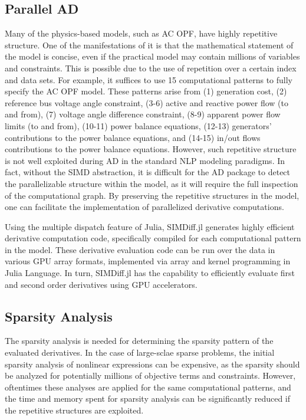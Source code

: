 \subsection{Parallel AD}
Many of the physics-based models, such as AC OPF, have highly repetitive
structure. One of the manifestations of it is that the mathematical
statement of the model is concise, even if the practical model may contain
millions of variables and constraints. This is possible due to the use of
repetition over a certain index and data sets. For example,
it suffices to use 15 computational patterns to fully specify the
AC OPF model. These patterns arise from (1) generation cost, (2) reference
bus voltage angle constraint, (3-6) active and reactive power flow (to
and from), (7) voltage angle difference constraint, (8-9) apparent
power flow limits (to and from), (10-11) power balance equations,
(12-13) generators' contributions to the power balance equations, and
(14-15) in/out flows contributions to the power balance
equations. However, such repetitive structure is not well exploited
during AD in the standard NLP modeling paradigms.  In
fact, without the SIMD abstraction, it is difficult for the AD package
to detect the parallelizable structure within the model, as it will
require the full inspection of the computational graph. By preserving
the repetitive structures in the model, one can facilitate the
implementation of parallelized derivative computations.

Using the multiple dispatch feature of Julia, SIMDiff.jl generates
highly efficient derivative computation code, specifically compiled
for each computational pattern in the model. These derivative
evaluation code can be run over the data in various GPU array formats,
implemented via array and kernel programming in Julia Language. In
turn, SIMDiff.jl has the capability to efficiently evaluate first and
second order derivatives using GPU accelerators.

\subsection{Sparsity Analysis}
The sparsity analysis is needed for determining the sparsity pattern
of the evaluated derivatives. In the case of large-sclae sparse
problems, the initial sparsity analysis of nonlinear expressions can
be expensive, as the sparsity should be analyzed for potentially
millions of objective terms and constraints. However, oftentimes
these analyses are applied for the same computational patterns, and
the time and memory spent for sparsity analysis can be significantly
reduced if the repetitive structures are exploited.

